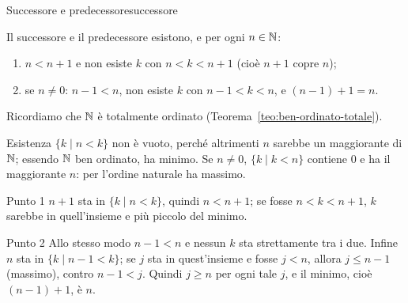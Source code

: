 \begin{concetto}
\begin{Proposizione}{Successore e predecessore}{successore}
    \begin{prerequisiti}
    \end{prerequisiti}
    Il successore e il predecessore esistono, e per ogni $n \in \mathbb{N}$:
    \begin{enumerate}
        \item $n < n + 1$ e non esiste $k$ con $n < k < n + 1$ (cioè $n + 1$ copre $n$);
        \item se $n \neq 0$: $n - 1 < n$, non esiste $k$ con $n - 1 < k < n$, e $(n - 1) + 1 = n$.
    \end{enumerate}
\end{Proposizione}
\begin{dimostrazione}
    Ricordiamo che $\mathbb{N}$ è totalmente ordinato (Teorema~\ref{teo:ben-ordinato-totale}).
    \begin{caso}{Esistenza}
        $\{k \mid n < k\}$ non è vuoto, perché altrimenti $n$ sarebbe un maggiorante di $\mathbb{N}$; essendo $\mathbb{N}$ ben ordinato, ha minimo.
        Se $n \neq 0$, $\{k \mid k < n\}$ contiene $0$ e ha il maggiorante $n$: per l'ordine naturale ha massimo.
    \end{caso}
    \begin{caso}{Punto 1}
        $n + 1$ sta in $\{k \mid n < k\}$, quindi $n < n + 1$; se fosse $n < k < n + 1$, $k$ sarebbe in quell'insieme e più piccolo del minimo.
    \end{caso}
    \begin{caso}{Punto 2}
        Allo stesso modo $n - 1 < n$ e nessun $k$ sta strettamente tra i due. Infine $n$ sta in $\{k \mid n - 1 < k\}$; se $j$ sta in
        quest'insieme e fosse $j < n$, allora $j \leq n - 1$ (massimo), contro $n - 1 < j$. Quindi $j \geq n$ per ogni tale $j$, e il
        minimo, cioè $(n - 1) + 1$, è $n$.
    \end{caso}
\end{dimostrazione}
\end{concetto}

